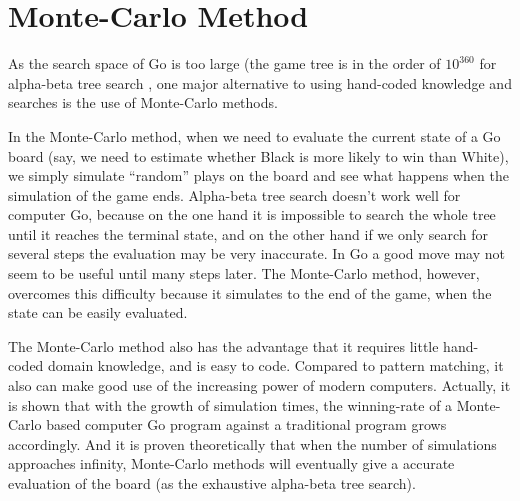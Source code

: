 

\section{Monte-Carlo Method}
As the search space of Go is too large (the game tree is in the order of $10^{360}$ for alpha-beta tree search \cite{bouzy2001computer}, one major alternative to using hand-coded knowledge and searches is the use of Monte-Carlo methods.

In the Monte-Carlo method, when we need to evaluate the current state of a Go board (say, we need to estimate whether Black is more likely to win than White), we simply simulate ``random'' plays on the board and see what happens when the simulation of the game ends. Alpha-beta tree search doesn't work well for computer Go, because on the one hand it is impossible to search the whole tree until it reaches the terminal state, and on the other hand if we only search for several steps the evaluation may be very inaccurate. In Go a good move may not seem to be useful until many steps later. The Monte-Carlo method, however, overcomes this difficulty because it simulates to the end of the game, when the state can be easily evaluated.

The Monte-Carlo method also has the advantage that it requires little hand-coded domain knowledge, and is easy to code. Compared to pattern matching, it also can make good use of the increasing power of modern computers. Actually, it is shown that with the growth of simulation times, the winning-rate of a Monte-Carlo based computer Go program against a traditional program grows accordingly\cite{enzenberger2010fuego}. And it is proven theoretically that when the number of simulations approaches infinity, Monte-Carlo methods will eventually give a accurate evaluation of the board (as the exhaustive alpha-beta tree search)\cite{kocsis2006bandit}.


